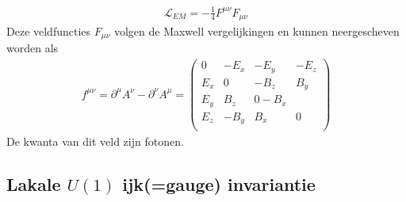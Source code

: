 \documentclass[../main.tex]{subfiles}
\begin{document}
\begin{itemize}
        \begin{equation}
            \begin{aligned}
                \label{eq:lagr_vec}
                \mathcal{L}_{EM} = - \frac{1}{4} F^{\mu\nu}F_{\mu\nu}
            \end{aligned}
        \end{equation}
        Deze veldfuncties $F_{\mu\nu}$ volgen de Maxwell vergelijkingen en kunnen neergescheven worden als
        \begin{equation}
            \begin{aligned}
                \label{eq:veld_func_em}
                f^{\mu\nu} = \partial^\mu A^\nu - \partial^\nu A^\mu =
                \begin{pmatrix}
                    0 & -E_x & -E_y & -E_z \\
                    E_x & 0 & -B_z & B_y \\
                    E_y & B_z & 0 -B_x \\
                    E_z & -B_y & B_x & 0 \\
                \end{pmatrix}
            \end{aligned}
        \end{equation}
        De kwanta van dit veld zijn fotonen.
\end{itemize}

\subsection{Lakale $U(1)$ ijk(=gauge) invariantie}%
\label{sub:lakale_u_1_gauge_invariantie}
\end{document}
